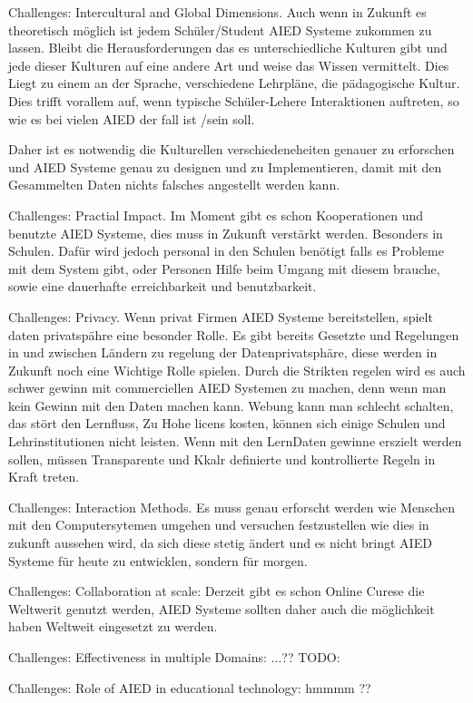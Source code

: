 Challenges: Intercultural and Global Dimensions. Auch wenn in Zukunft es theoretisch möglich ist jedem Schüler/Student AIED Systeme zukommen zu lassen.
 Bleibt die Herausforderungen das es unterschiedliche Kulturen gibt und jede dieser Kulturen auf eine andere Art und weise das Wissen vermittelt. Dies Liegt zu einem an der Sprache, 
 verschiedene Lehrpläne, die pädagogische Kultur. Dies trifft vorallem auf, wenn typische Schüler-Lehere Interaktionen auftreten, so wie es bei vielen AIED der fall ist /sein soll.

 Daher ist es notwendig die Kulturellen verschiedeneheiten genauer zu erforschen und AIED Systeme genau zu designen und zu Implementieren, damit mit den Gesammelten Daten nichts falsches angestellt werden kann.

 Challenges: Practial Impact. Im Moment gibt es schon Kooperationen und benutzte AIED Systeme, dies muss in Zukunft verstärkt werden. Besonders in Schulen. Dafür wird jedoch personal in den Schulen benötigt
 falls es Probleme mit dem System gibt, oder Personen Hilfe beim Umgang mit diesem brauche, sowie eine dauerhafte erreichbarkeit und benutzbarkeit.


 Challenges: Privacy. Wenn privat Firmen AIED Systeme bereitstellen, spielt daten privatspähre eine besonder Rolle. Es gibt bereits Gesetzte und Regelungen in und zwischen Ländern zu regelung der Datenprivatsphäre, diese 
 werden in Zukunft noch eine Wichtige Rolle spielen. Durch die Strikten regelen wird es auch schwer gewinn mit commerciellen AIED Systemen zu machen, denn wenn man kein Gewinn mit den Daten machen kann. Webung kann man schlecht schalten, das stört den Lernfluss,
 Zu Hohe licens kosten, können sich einige Schulen und Lehrinstitutionen nicht leisten. Wenn mit den LernDaten gewinne erszielt werden sollen, müssen Transparente und Kkalr definierte und kontrollierte Regeln in Kraft treten.


 Challenges: Interaction Methods. Es muss genau erforscht werden wie Menschen mit den Computersytemen umgehen und versuchen festzustellen wie dies in zukunft aussehen wird, da sich diese stetig ändert und es nicht bringt
 AIED Systeme für heute zu entwicklen, sondern für morgen.


 Challenges: Collaboration at scale: Derzeit gibt es schon Online Curese die Weltwerit genutzt werden, AIED Systeme sollten daher auch die möglichkeit haben Weltweit eingesetzt zu werden.

 Challenges: Effectiveness in multiple Domains: ...?? TODO:


 Challenges: Role of AIED in educational technology: hmmmm ??
